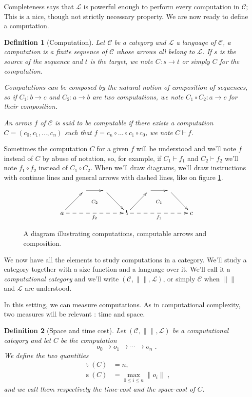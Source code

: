 \documentclass{article}
\newcommand{\cat}[1]{\mathscr{#1}}
\newcommand{\C}{\cat{C}}
\renewcommand{\L}{\cat{L}}
\newcommand{\comp}{\circ}
\newcommand{\size}[1]{\lVert#1\rVert}
\newcommand{\ra}{\rightarrow}
\DeclareMathOperator{\Time}{t}
\DeclareMathOperator{\Space}{s}
\newcommand{\computes}{\vdash}
\newtheorem{definition}{Definition}
\begin{document}
  Completeness says that $\L$ is powerful enough to perform every
  computation in $\C$; This is a nice, though not strictly necessary
  property. We are now ready to define a computation.

  \begin{definition}[Computation]
    Let $\C$ be a category and $\L$ a language of $\C$, a
    \emph{computation} is a finite sequence of $\C$ whose arrows all
    belong to $\L$. If $s$ is the source of the sequence and $t$ is
    the target, we note $C:s\ra t$ or simply $C$ for the
    computation.
    
    Computations can be composed by the natural notion of composition
    of sequences, so if $C_1 : b\ra c$ and $C_2 : a\ra b$ are two
    computations, we note $C_1\comp C_2 : a\ra c$ for their
    composition.

    An arrow $f$ of $\C$ is said to be \emph{computable} if there
    exists a computation $C = (c_0, c_1,\ldots,c_n)$ such that $f =
    c_n\comp\ldots\comp c_1\comp c_0$, we note $C\computes f$.
  \end{definition}

  Sometimes the computation $C$ for a given $f$ will be understood and
  we'll note $f$ instead of $C$ by abuse of notation, so, for example,
  if $C_1\computes f_1$ and $C_2\computes f_2$ we'll note $f_1\comp
  f_2$ instead of $C_1\comp C_2$. When we'll draw diagrams, we'll draw
  instructions with continue lines and general arrows with dashed
  lines, like on figure \ref{fig:comp}.
  \begin{figure}[!h]
    \[\xymatrix{
      & \ar[r]\ar@{}[dr]|{C_2} & \ar[dr] &
      & \ar[r]\ar@{}[dr]|{C_1} & \ar[dr] \\
      a \ar[ur]\ar@{-->}[rrr]_{f_2} &&& b
      \ar[ur]\ar@{-->}[rrr]_{f_1} &&& c
    }\]
    \caption{\label{fig:comp}A diagram illustrating computations,
    computable arrows and composition.}
  \end{figure}
  
  We now have all the elements to study computations in a
  category. We'll study a category together with a size function and a
  language over it. We'll call it a \emph{computational category} and
  we'll write $(\C, \size{}, \L)$, or simply $\C$ when $\size{}$ and
  $\L$ are understood.

  In this setting, we can measure computations. As in computational
  complexity, two measures will be relevant : time and space.

  \begin{definition}[Space and time cost]
    Let $(\C, \size{}, \L)$ be a computational category and let $C$ be
    the computation
    \[o_0 \ra o_1 \ra \cdots \ra o_n \text{ .}\]
    We define the two quantities
    \begin{align*}
      \Time(C) &= n \text{,} \\
      \Space(C) &= \max_{0\le i \le n} \size{o_i} \text{ ,}
    \end{align*}
    and we call them respectively the \emph{time-cost} and the
    \emph{space-cost} of $C$.
  \end{definition}
\end{document}
